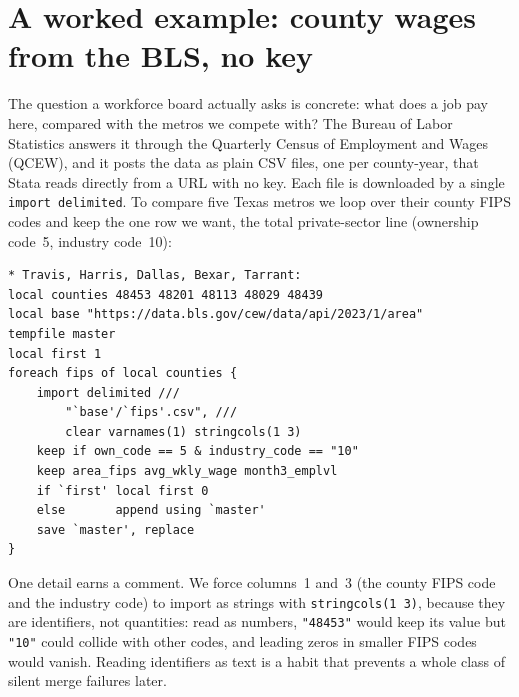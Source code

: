 \documentclass[
    a4paper,
    fontsize=10pt,
    twoside=true,
    numbers=noenddot,
]{kaobook}
\begin{document}
\section{A worked example: county wages from the BLS, no key}\label{sec:qcew}
The question a workforce board actually asks is concrete: what does a job pay here, compared with the metros we compete with? The Bureau of Labor Statistics answers it through the Quarterly Census of Employment and Wages (QCEW), and it posts the data as plain CSV files, one per county-year, that Stata reads directly from a URL with no key. Each file is downloaded by a single \texttt{import delimited}. To compare five Texas metros we loop over their county FIPS codes and keep the one row we want, the total private-sector line (ownership code~5, industry code~10):
{\footnotesize
\begin{verbatim}
* Travis, Harris, Dallas, Bexar, Tarrant:
local counties 48453 48201 48113 48029 48439
local base "https://data.bls.gov/cew/data/api/2023/1/area"
tempfile master
local first 1
foreach fips of local counties {
    import delimited ///
        "`base'/`fips'.csv", ///
        clear varnames(1) stringcols(1 3)
    keep if own_code == 5 & industry_code == "10"
    keep area_fips avg_wkly_wage month3_emplvl
    if `first' local first 0
    else       append using `master'
    save `master', replace
}
\end{verbatim}
}
One detail earns a comment. We force columns~1 and~3 (the county FIPS code and the industry code) to import as strings with \texttt{stringcols(1 3)}, because they are identifiers, not quantities: read as numbers, \texttt{"48453"} would keep its value but \texttt{"10"} could collide with other codes, and leading zeros in smaller FIPS codes would vanish. Reading identifiers as text is a habit that prevents a whole class of silent merge failures later.
\end{document}
